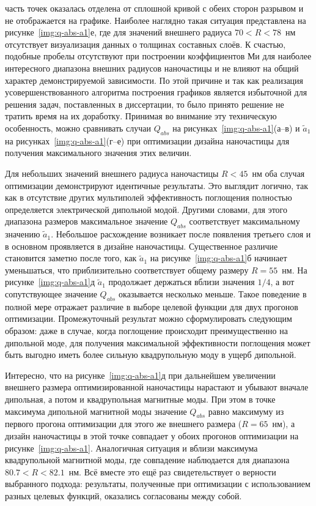часть точек оказалась отделена от сплошной кривой с обеих сторон
разрывом и не отображается на графике.  Наиболее наглядно такая
ситуация представлена на рисунке~\ref{img:q-abs-a1}е, где для значений
внешнего радиуса $70<R<78$~нм отсутствует визуализация данных о
толщинах составных слоёв.  К счастью, подобные пробелы отсутствуют при
построении коэффициентов Ми для наиболее интересного диапазона внешних
радиусов наночастицы и не влияют на общий характер демонстрируемой
зависимости. По этой причине и так как реализация усовершенствованного
алгоритма построения графиков является избыточной для решения задач,
поставленных в диссертации, то было принято решение не тратить время
на их доработку.  Принимая во внимание эту техническую особенность,
можно сравнивать случаи $Q_{abs}$ на рисунках~\ref{img:q-abs-a1}(а--в)
и $\tilde{a}_1$ на рисунках~\ref{img:q-abs-a1}(г--е) при оптимизации
дизайна наночастицы для получения максимального значения этих величин.

Для небольших значений внешнего радиуса наночастицы $R<45$~нм оба
случая оптимизации демонстрируют идентичные результаты. Это выглядит
логично, так как в отсутствие других мультиполей эффективность
поглощения полностью определяется электрической дипольной
модой. Другими словами, для этого диапазона размеров максимальное
значение $Q_{abs}$ соответствует максимальному значению
$\tilde{a}_1$. Небольшое расхождение возникает после появления
третьего слоя и в основном проявляется в дизайне наночастицы.
Существенное различие становится заметно после того, как $\tilde{a}_1$
на рисунке~\ref{img:q-abs-a1}б начинает уменьшаться, что
приблизительно соответствует общему размеру $R=55$~нм. На
рисунке~\ref{img:q-abs-a1}д $\tilde{a}_1$ продолжает держаться
вблизи значения $1/4$, а вот сопутствующее значение $Q_{abs}$
оказывается несколько меньше. Такое поведение в полной мере отражает
различие в выборе целевой функции для двух прогонов
оптимизации. Промежуточный результат можно сформулировать следующим
образом: даже в случае, когда поглощение происходит преимущественно на
дипольной моде, для получения максимальной эффективности поглощения
может быть выгодно иметь более сильную квадрупольную моду в ущерб
дипольной.

Интересно, что на рисунке~\ref{img:q-abs-a1}д при дальнейшем
увеличении внешнего размера оптимизированной наночастицы нарастают и
убывают вначале дипольная, а потом и квадрупольная магнитные моды. При
этом в точке максимума дипольной магнитной моды значение $Q_{abs}$
равно максимуму из первого прогона оптимизации для этого же внешнего
размера ($R=65$~нм), а дизайн наночастицы в этой точке совпадает у
обоих прогонов оптимизации на рисунке~\ref{img:q-abs-a1}.  Аналогичная
ситуация и вблизи максимума квадрупольной магнитной моды, где
совпадение наблюдается для диапазона $80.7<R<82.1$~нм.  Всё вместе это
ещё раз свидетельствует о верности выбранного подхода: результаты,
полученные при оптимизации с использованием разных целевых функций,
оказались согласованы между собой. 

